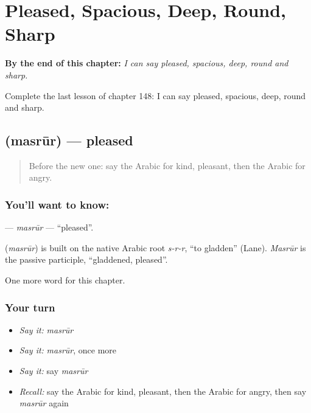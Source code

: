 
\chapter{Pleased, Spacious, Deep, Round, Sharp}
\label{ch:ar-pleased-spacious-deep-round-sharp}

\begin{chapteropening}
\textbf{By the end of this chapter:} \emph{I can say pleased, spacious, deep, round and sharp.}

Complete the last lesson of chapter 148: I can say pleased, spacious, deep, round and sharp.
\end{chapteropening}

\section[\texorpdfstring{\ar{مسرور} (masrūr)}{مسرور (masrūr)}]{ (masrūr) — pleased}

\label{lesson:AR-C148-masrur}



\begin{quote}
Before the new one: say the Arabic for kind, pleasant, then the Arabic for angry.
\end{quote}

\subsection*{You'll want to know: }
\textbf{} — \emph{masrūr} — \textquotedblleft{}pleased\textquotedblright{}.

\begin{cousinweb}
\textbf{} (\emph{masrūr}) is built on the native Arabic root \emph{s-r-r}, \textquotedblleft{}to gladden\textquotedblright{} (Lane). \emph{Masrūr} is the passive participle, \textquotedblleft{}gladdened, pleased\textquotedblright{}.
\end{cousinweb}

\begin{grammarlens}[title={What you've built}]
One more word for this chapter.
\end{grammarlens}

\subsection*{Your turn}
\begin{itemize}
\raggedright
  \item \emph{Say it:} \emph{masrūr}
  \item \emph{Say it:} \emph{masrūr}, once more
  \item \emph{Say it:} say \emph{masrūr}
  \item \emph{Recall:} say the Arabic for kind, pleasant, then the Arabic for angry, then say \emph{masrūr} again
\end{itemize}

